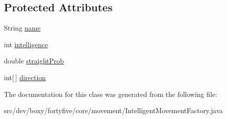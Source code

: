 \subsection*{Protected Attributes}
\begin{DoxyCompactItemize}
\item 
String \hyperlink{group___intelligent_movement_gadc27ef2838bc9382f21b3ffc79d89404}{name}
\item 
int \hyperlink{group___intelligent_movement_ga9b0e82846a0b0570d87fd50d9c979968}{intelligence}
\item 
double \hyperlink{group___intelligent_movement_ga4cd10d785da44dfc2460c4ea999adcc1}{straightProb}
\item 
int\mbox{[}$\,$\mbox{]} \hyperlink{group___intelligent_movement_ga6b8b74cf3c1bd96c164971c71ce7a2ca}{direction}
\end{DoxyCompactItemize}


The documentation for this class was generated from the following file:\begin{DoxyCompactItemize}
\item 
src/dev/boxy/fortyfive/core/movement/IntelligentMovementFactory.java\end{DoxyCompactItemize}
